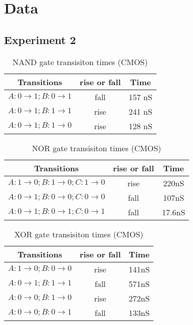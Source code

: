 \documentclass[10pt]{article}
\begin{document}
\section{Data}

\subsection{Experiment 2}

\begin{table}[H]
	\centering
	\begin{tabular}{ c|c|c }
	Transitions & rise or fall & Time \\ \hline
	$A:0 \rightarrow 1; B:0 \rightarrow 1$ & fall & 157 nS \\
	$A:0 \rightarrow 1; B:1 \rightarrow 1$ & rise & 241 nS \\
	$A:0 \rightarrow 1; B:1 \rightarrow 0$ & rise & 128 nS \\
	\end{tabular}
	\label{tbl:nand}
	\caption{NAND gate transisiton times (CMOS)}
\end{table}

\begin{table}[H]
	\centering
	\begin{tabular}{ c|c|c }
	Transitions & rise or fall & Time \\ \hline
	$A:1 \rightarrow 0; B:1 \rightarrow 0; C:1 \rightarrow 0$ & rise &
	220nS \\
	$A:0 \rightarrow 1; B:0 \rightarrow 0; C:0 \rightarrow 0$ & fall &
	107nS \\
	$A:0 \rightarrow 1; B:0 \rightarrow 1; C:0 \rightarrow 1$ & fall &
	17.6nS \\
	\end{tabular}
	\label{tbl:nor}
	\caption{NOR gate transisiton times (CMOS)}
\end{table}

\begin{table}[H]
	\centering
	\begin{tabular}{ c|c|c }
	Transitions & rise or fall & Time \\ \hline
	$A:1 \rightarrow 0; B:0 \rightarrow 0$ & rise &	141nS \\
	$A:0 \rightarrow 1; B:1 \rightarrow 1$ & fall & 571nS \\
	$A:0 \rightarrow 0; B:1 \rightarrow 0$ & rise &	272nS \\
	$A:0 \rightarrow 0; B:0 \rightarrow 1$ & fall &	133nS \\
	\end{tabular}
	\label{tbl:xor}
	\caption{XOR gate transisiton times (CMOS)}
\end{table}
\end{document}
